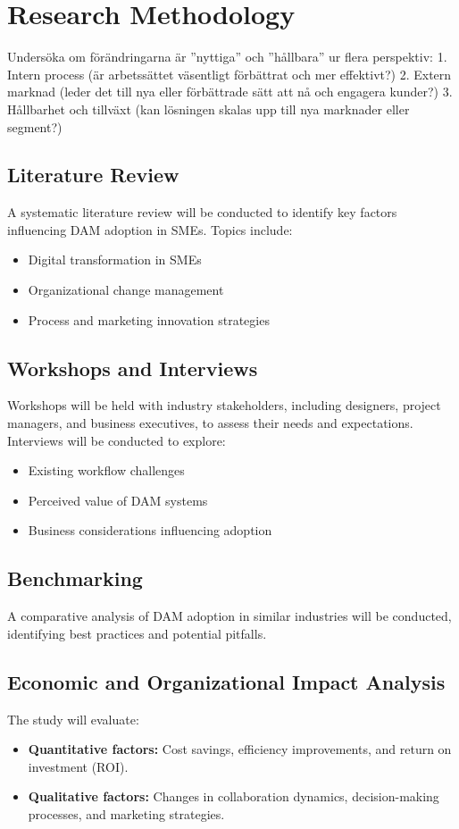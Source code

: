 \documentclass[a4paper,12pt,twocolumn]{article}
\begin{document}
\section{Research Methodology}
Undersöka om förändringarna är ”nyttiga” och ”hållbara” ur flera perspektiv:
1. Intern process (är arbetssättet väsentligt förbättrat och mer effektivt?)
2. Extern marknad (leder det till nya eller förbättrade sätt att nå och engagera kunder?)
3. Hållbarhet och tillväxt (kan lösningen skalas upp till nya marknader eller segment?)

\subsection{Literature Review}
A systematic literature review will be conducted to identify key factors influencing DAM adoption in SMEs. Topics include:
\begin{itemize}
    \item Digital transformation in SMEs
    \item Organizational change management
    \item Process and marketing innovation strategies
\end{itemize}

\subsection{Workshops and Interviews}
Workshops will be held with industry stakeholders, including designers, project managers, and business executives, to assess their needs and expectations. Interviews will be conducted to explore:
\begin{itemize}
    \item Existing workflow challenges
    \item Perceived value of DAM systems
    \item Business considerations influencing adoption
\end{itemize}

\subsection{Benchmarking}
A comparative analysis of DAM adoption in similar industries will be conducted, identifying best practices and potential pitfalls.

\subsection{Economic and Organizational Impact Analysis}
The study will evaluate:
\begin{itemize}
    \item \textbf{Quantitative factors:} Cost savings, efficiency improvements, and return on investment (ROI).
    \item \textbf{Qualitative factors:} Changes in collaboration dynamics, decision-making processes, and marketing strategies.
\end{itemize}
\end{document}
